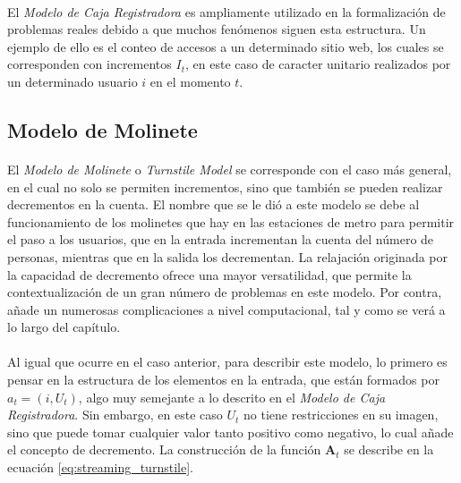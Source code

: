 \documentclass{subfiles}
\begin{document}
        \paragraph{}
        El \emph{Modelo de Caja Registradora} es ampliamente utilizado en la formalización de problemas reales debido a que muchos fenómenos siguen esta estructura. Un ejemplo de ello es el conteo de accesos a un determinado sitio web, los cuales se corresponden con incrementos $I_t$, en este caso de caracter unitario realizados por un determinado usuario $i$ en el momento $t$.


      \subsection{Modelo de Molinete}
      \label{sec:streaming_turnstile}

        \paragraph{}
        El \emph{Modelo de Molinete} o \emph{Turnstile Model} se corresponde con el caso más general, en el cual no solo se permiten incrementos, sino que también se pueden realizar decrementos en la cuenta. El nombre que se le dió a este modelo se debe al funcionamiento de los molinetes que hay en las estaciones de metro para permitir el paso a los usuarios, que en la entrada incrementan la cuenta del número de personas, mientras que en la salida los decrementan. La relajación originada por la capacidad de decremento ofrece una mayor versatilidad, que permite la contextualización de un gran número de problemas en este modelo. Por contra, añade un numerosas complicaciones a nivel computacional, tal y como se verá a lo largo del capítulo.

        \paragraph{}
        Al igual que ocurre en el caso anterior, para describir este modelo, lo primero es pensar en la estructura de los elementos en la entrada, que están formados por $a_t = (i, U_t)$, algo muy semejante a lo descrito en el \emph{Modelo de Caja Registradora}. Sin embargo, en este caso $U_t$ no tiene restricciones en su imagen, sino que puede tomar cualquier valor tanto positivo como negativo, lo cual añade el concepto de decremento. La construcción de la función $\boldsymbol{A}_{t}$ se describe en la ecuación \eqref{eq:streaming_turnstile}.
\end{document}
